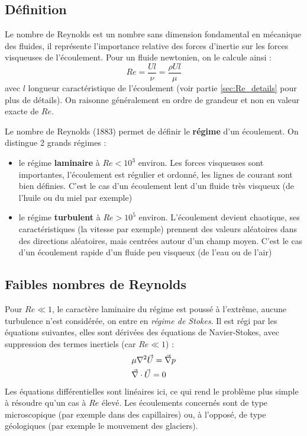 
\subsection{Définition}
Le nombre de Reynolds est un nombre sans dimension fondamental en mécanique des fluides, il représente l'importance relative des forces d'inertie sur les forces visqueuses de l'écoulement. Pour un fluide newtonien, on le calcule ainsi :
%
\begin{equation}
    Re = \frac{Ul}{\nu}
       = \frac{\rho U l}{\mu}
\end{equation}
%
avec $l$ longueur caractéristique de l'écoulement (voir partie \ref{sec:Re_details} pour plus de détails). On raisonne généralement en ordre de grandeur et non en valeur exacte de $Re$.

Le nombre de Reynolds (1883) permet de définir le \textbf{régime} d'un écoulement. On distingue 2 grands régimes :
%
\begin{itemize}
    \item le régime \textbf{laminaire} à $Re<10^3$ environ. Les forces visqueuses sont importantes, l'écoulement est régulier et ordonné, les lignes de courant sont bien définies. C'est le cas d'un écoulement lent d'un fluide très visqueux (de l'huile ou du miel par exemple)

    \item le régime \textbf{turbulent} à $Re>10^5$ environ. L'écoulement devient chaotique, ses caractéristiques (la vitesse par exemple) prennent des valeurs aléatoires dans des directions aléatoires, mais centrées autour d'un champ moyen. C'est le cas d'un écoulement rapide d'un fluide peu visqueux (de l'eau ou de l'air)
\end{itemize}


\subsection{Faibles nombres de Reynolds}
Pour $Re \ll 1$, le caractère laminaire du régime est poussé à l'extrême, aucune turbulence n'est considérée, on entre en \textit{régime de Stokes}. Il est régi par les équations suivantes, elles sont dérivées des équations de Navier-Stokes, avec suppression des termes inertiels (car $Re \ll 1$) :
%
\begin{align}[left=\empheqlbrace]
    & \mu \nabla^2 \vec{U} = \vec{\nabla} p\\
    \notag & \vec{\nabla} \cdot \vec{U} = 0
\end{align}
%
Les équations différentielles sont linéaires ici, ce qui rend le problème plus simple à résoudre qu'un cas à $Re$ élevé. Les écoulements concernés sont de type microscopique (par exemple dans des capillaires) ou, à l'opposé, de type géologiques (par exemple le mouvement des glaciers).


